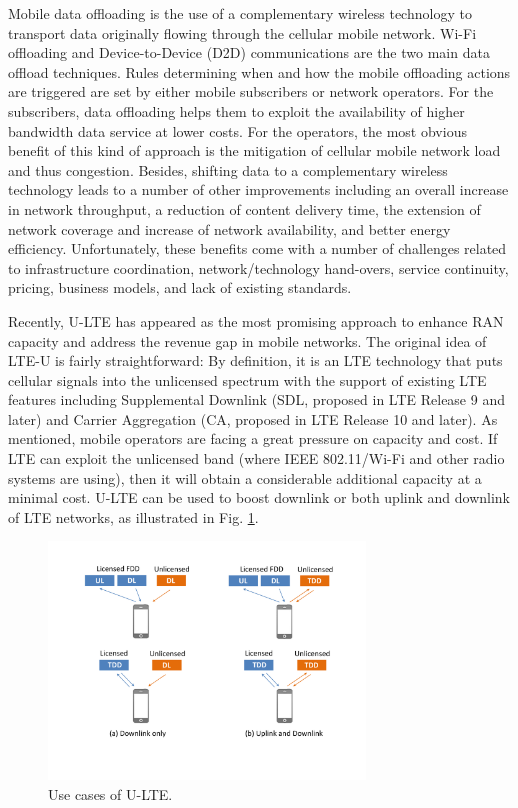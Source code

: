 Mobile data offloading is the use of a complementary wireless technology to transport data originally flowing through the cellular mobile network. Wi-Fi offloading and Device-to-Device (D2D) communications are the two main data offload techniques. Rules determining when and how the mobile offloading actions are triggered are set by either mobile subscribers or network operators. For the subscribers, data offloading helps them to exploit the availability of higher bandwidth data service at lower costs. For the operators, the most obvious benefit of this kind of approach is the mitigation of cellular mobile network load and thus congestion. Besides, shifting data to a complementary wireless technology leads to a number of other improvements including an overall increase in network throughput, a reduction of content delivery time, the extension of network coverage and increase of network availability, and better energy efficiency. Unfortunately, these benefits come with a number of challenges related to infrastructure coordination, network/technology hand-overs, service continuity, pricing, business models, and lack of existing standards. 

Recently, U-LTE has appeared as the most promising approach to enhance RAN capacity and address the revenue gap in mobile networks. The original idea of LTE-U is fairly straightforward: By definition, it is an LTE technology that puts cellular signals into the unlicensed spectrum with the support of existing LTE features including Supplemental Downlink (SDL, proposed in LTE Release 9 and later) and Carrier Aggregation (CA, proposed in LTE Release 10 and later).  As mentioned, mobile operators are facing a great pressure on capacity and cost. If LTE can exploit the unlicensed band (where IEEE 802.11/Wi-Fi and other radio systems are using), then it will obtain a considerable additional capacity at a minimal cost. U-LTE can be used to boost downlink or both uplink and downlink of LTE networks, as illustrated in Fig. \ref{figs:U-LTE-use_model}.
\begin{figure}[!ht]
	\centering
	\includegraphics[width=0.75\textwidth]{figs/U-LTE-use_model}
	\caption{Use cases of U-LTE.}
	\label{figs:U-LTE-use_model}
\end{figure}

